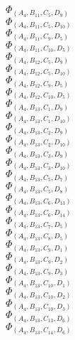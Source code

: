 \documentclass[14pt]{article}
\begin{document}
    $\Phi_{({A}_{4}, {B}_{11}, {C}_{5}, {D}_{9})}$ \\ 
    $\Phi_{({A}_{4}, {B}_{11}, {C}_{5}, {D}_{10})}$ \\ 
    $\Phi_{({A}_{4}, {B}_{11}, {C}_{9}, {D}_{5})}$ \\ 
    $\Phi_{({A}_{4}, {B}_{11}, {C}_{10}, {D}_{5})}$ \\ 
    $\Phi_{({A}_{4}, {B}_{12}, {C}_{5}, {D}_{9})}$ \\ 
    $\Phi_{({A}_{4}, {B}_{12}, {C}_{5}, {D}_{10})}$ \\ 
    $\Phi_{({A}_{4}, {B}_{12}, {C}_{9}, {D}_{5})}$ \\ 
    $\Phi_{({A}_{4}, {B}_{12}, {C}_{10}, {D}_{5})}$ \\ 
    $\Phi_{({A}_{4}, {B}_{13}, {C}_{1}, {D}_{9})}$ \\ 
    $\Phi_{({A}_{4}, {B}_{13}, {C}_{1}, {D}_{10})}$ \\ 
    $\Phi_{({A}_{4}, {B}_{13}, {C}_{2}, {D}_{9})}$ \\ 
    $\Phi_{({A}_{4}, {B}_{13}, {C}_{2}, {D}_{10})}$ \\ 
    $\Phi_{({A}_{4}, {B}_{13}, {C}_{3}, {D}_{9})}$ \\ 
    $\Phi_{({A}_{4}, {B}_{13}, {C}_{3}, {D}_{10})}$ \\ 
    $\Phi_{({A}_{4}, {B}_{13}, {C}_{5}, {D}_{7})}$ \\ 
    $\Phi_{({A}_{4}, {B}_{13}, {C}_{5}, {D}_{8})}$ \\ 
    $\Phi_{({A}_{4}, {B}_{13}, {C}_{6}, {D}_{13})}$ \\ 
    $\Phi_{({A}_{4}, {B}_{13}, {C}_{6}, {D}_{14})}$ \\ 
    $\Phi_{({A}_{4}, {B}_{13}, {C}_{7}, {D}_{5})}$ \\ 
    $\Phi_{({A}_{4}, {B}_{13}, {C}_{8}, {D}_{5})}$ \\ 
    $\Phi_{({A}_{4}, {B}_{13}, {C}_{9}, {D}_{1})}$ \\ 
    $\Phi_{({A}_{4}, {B}_{13}, {C}_{9}, {D}_{2})}$ \\ 
    $\Phi_{({A}_{4}, {B}_{13}, {C}_{9}, {D}_{3})}$ \\ 
    $\Phi_{({A}_{4}, {B}_{13}, {C}_{10}, {D}_{1})}$ \\ 
    $\Phi_{({A}_{4}, {B}_{13}, {C}_{10}, {D}_{2})}$ \\ 
    $\Phi_{({A}_{4}, {B}_{13}, {C}_{10}, {D}_{3})}$ \\ 
    $\Phi_{({A}_{4}, {B}_{13}, {C}_{13}, {D}_{6})}$ \\ 
    $\Phi_{({A}_{4}, {B}_{13}, {C}_{14}, {D}_{6})}$ \\ 
\end{document}
